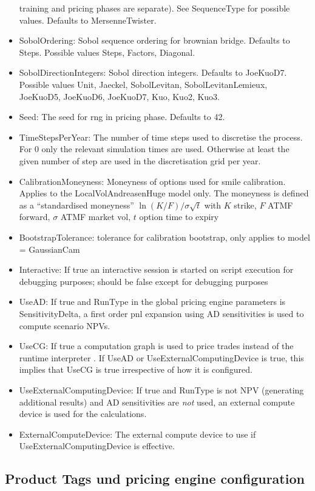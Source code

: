 \begin{itemize}
  training and pricing phases are separate). See SequenceType for possible values. Defaults to MersenneTwister.
\item SobolOrdering: Sobol sequence ordering for brownian bridge. Defaults to Steps. Possible values Steps, Factors,
  Diagonal.
\item SobolDirectionIntegers: Sobol direction integers. Defaults to JoeKuoD7. Possible values Unit, Jaeckel,
  SobolLevitan, SobolLevitanLemieux, JoeKuoD5, JoeKuoD6, JoeKuoD7, Kuo, Kuo2, Kuo3.
\item Seed: The seed for rng in pricing phase. Defaults to 42.
\item TimeStepsPerYear: The number of time steps used to discretise the process. For 0 only the relevant simulation
  times are used. Otherwise at least the given number of step are used in the discretisation grid per year.
\item CalibrationMoneyness: Moneyness of options used for smile calibration. Applies to the LocalVolAndreasenHuge model
  only. The moneyness is defined as a ``standardised moneyness'' $\ln(K/F) / \sigma\sqrt{t}$ with $K$ strike, $F$ ATMF
  forward, $\sigma$ ATMF market vol, $t$ option time to expiry
\item BootstrapTolerance: tolerance for calibration bootstrap, only applies to model = GaussianCam
\item Interactive: If true an interactive session is started on script execution for debugging purposes; should be false
  except for debugging purposes
\item UseAD: If true and RunType in the global pricing engine parameters is SensitivityDelta, a first order pnl
  expansion using AD sensitivities is used to compute scenario NPVs.
\item UseCG: If true a computation graph is used to price trades instead of the runtime interpreter . If UseAD or
  UseExternalComputingDevice is true, this implies that UseCG is true irrespective of how it is configured.
\item UseExternalComputingDevice: If true and RunType is not NPV (generating additional results) and AD sensitivities
  are {\em not} used, an external compute device is used for the calculations.
\item ExternalComputeDevice: The external compute device to use if UseExternalComputingDevice is effective.
\end{itemize}

\subsection{Product Tags und pricing engine configuration}\label{producttags_engineconfig}

